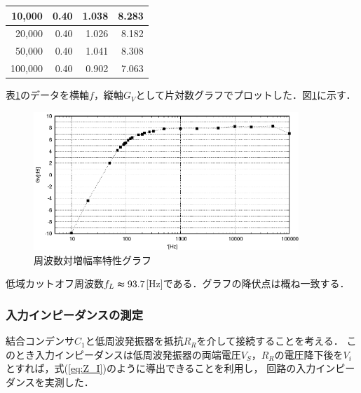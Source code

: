 \documentclass[dvipdfmx,titlepage,a4j]{jsarticle}  %
\numberwithin{equation}{section}
\begin{document}
\begin{table}[H]
\begin{center}
\begin{tabular}{r|r|r|r}
      10,000                                   & 0.40                                            & 1.038                                     & 8.283                                  \\ \hline
      20,000                                   & 0.40                                            & 1.026                                     & 8.182                                  \\ \hline
      50,000                                   & 0.40                                            & 1.041                                     & 8.308                                  \\ \hline
      100,000                                  & 0.40                                            & 0.902                                     & 7.063                                  \\ \hline
    \end{tabular}
  \end{center}
  \label{tbl:res;f-gain}
\end{table}

表\ref{tbl:res;f-gain}のデータを横軸$f$，縦軸$G_V$として片対数グラフでプロットした．図\ref{fig:f-gv.eps}に示す．

\begin{figure}[H]
  \centering
  \includegraphics[width=10cm]{../gnuplot/f-gv.eps}
  \caption{周波数対増幅率特性グラフ}
  \label{fig:f-gv.eps}
\end{figure}

低域カットオフ周波数$f_L \thickapprox 93.7$[Hz]である．グラフの降伏点は概ね一致する．

\subsubsection{入力インピーダンスの測定}
結合コンデンサ$C_1$と低周波発振器を抵抗$R_R$を介して接続することを考える．
このとき入力インピーダンスは低周波発振器の両端電圧$V_S$，$R_R$の電圧降下後を$V_i$とすれば，式(\ref{eq:Z_I})のように導出できることを利用し，
回路の入力インピーダンスを実測した．
\end{document}
